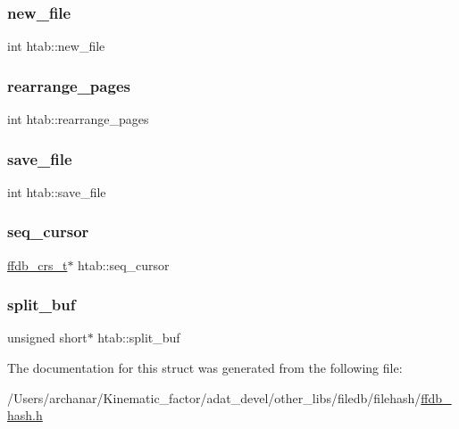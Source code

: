 \subsubsection{\texorpdfstring{new\_file}{new\_file}}
{\footnotesize\ttfamily int htab\+::new\+\_\+file}

\mbox{\label{structhtab_af3b2be98fadf5037c0b44dedc5c2c08d}} 
\subsubsection{\texorpdfstring{rearrange\_pages}{rearrange\_pages}}
{\footnotesize\ttfamily int htab\+::rearrange\+\_\+pages}

\mbox{\label{structhtab_ae130587a915749306b8f12b54c592545}} 
\subsubsection{\texorpdfstring{save\_file}{save\_file}}
{\footnotesize\ttfamily int htab\+::save\+\_\+file}

\mbox{\label{structhtab_a7ed0276958f6e0e778ea4398c53aef40}} 
\subsubsection{\texorpdfstring{seq\_cursor}{seq\_cursor}}
{\footnotesize\ttfamily \mbox{\hyperlink{ffdb__hash_8h_a103d84beefb6d7306cb252c4d7f25479}{ffdb\+\_\+crs\+\_\+t}}$\ast$ htab\+::seq\+\_\+cursor}

\mbox{\label{structhtab_acf1c05487c78d14d6897d1d51d5ba704}} 
\subsubsection{\texorpdfstring{split\_buf}{split\_buf}}
{\footnotesize\ttfamily unsigned short$\ast$ htab\+::split\+\_\+buf}



The documentation for this struct was generated from the following file\+:\begin{DoxyCompactItemize}
\item 
/\+Users/archanar/\+Kinematic\+\_\+factor/adat\+\_\+devel/other\+\_\+libs/filedb/filehash/\mbox{\hyperlink{ffdb__hash_8h}{ffdb\+\_\+hash.\+h}}\end{DoxyCompactItemize}
